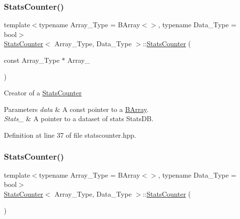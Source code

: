 \subsubsection{\texorpdfstring{Stats\+Counter()}{StatsCounter()}\hspace{0.1cm}{\footnotesize\ttfamily [1/2]}}
{\footnotesize\ttfamily template$<$typename Array\+\_\+\+Type = B\+Array$<$$>$, typename Data\+\_\+\+Type = bool$>$ \\
\hyperlink{class_stats_counter}{Stats\+Counter}$<$ Array\+\_\+\+Type, Data\+\_\+\+Type $>$\+::\hyperlink{class_stats_counter}{Stats\+Counter} (\begin{DoxyParamCaption}\item[{const Array\+\_\+\+Type $\ast$}]{Array\+\_\+ }\end{DoxyParamCaption})\hspace{0.3cm}{\ttfamily [inline]}}



Creator of a {\ttfamily \hyperlink{class_stats_counter}{Stats\+Counter}} 


\begin{DoxyParams}{Parameters}
{\em data} & A const pointer to a {\ttfamily \hyperlink{class_b_array}{B\+Array}}. \\
\hline
{\em Stats\+\_\+} & A pointer to a dataset of stats {\ttfamily Stats\+DB}. \\
\hline
\end{DoxyParams}


Definition at line 37 of file statscounter.\+hpp.

\mbox{\label{class_stats_counter_a6cef1e5bb4914a49ba8dd0f63070f81c}} 
\subsubsection{\texorpdfstring{Stats\+Counter()}{StatsCounter()}\hspace{0.1cm}{\footnotesize\ttfamily [2/2]}}
{\footnotesize\ttfamily template$<$typename Array\+\_\+\+Type = B\+Array$<$$>$, typename Data\+\_\+\+Type = bool$>$ \\
\hyperlink{class_stats_counter}{Stats\+Counter}$<$ Array\+\_\+\+Type, Data\+\_\+\+Type $>$\+::\hyperlink{class_stats_counter}{Stats\+Counter} (\begin{DoxyParamCaption}{ }\end{DoxyParamCaption})\hspace{0.3cm}{\ttfamily [inline]}}




